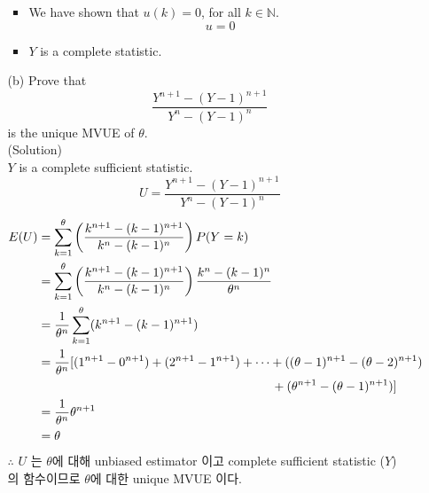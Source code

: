 \documentclass{oblivoir}
\newcommand{\flr}[1]{\left ( #1 \right )}
\newcommand{\blue}[1]{{\color{blue} #1}}
\begin{document}
\begin{enumerate}
\begin{enumerate}
\begin{itemize}
\item
We have shown that $u(k) = 0$, for all $k \in \mathbb{N}$.
$$
u = 0
$$

\item 
$Y$ is a complete statistic.
\end{itemize}

\vspace{3mm}
\item[(b)]
Prove that
$$
\frac{Y^{n+1} - (Y - 1)^{n+1}}{Y^n - (Y - 1)^n}
$$
is the unique MVUE of $\theta$. \\
\blue{(Solution)} \\
$Y$ is a complete sufficient statistic.
$$
U = \frac{Y^{n+1} - (Y - 1)^{n+1}}{Y^n - (Y - 1)^n}
$$
\begin{align*}
E(U) &= \sum_{k=1}^{\theta} \flr{\frac{k^{n+1} - (k - 1)^{n+1}}{k^n - (k - 1)^n}} P(Y=k) \\
&= \sum_{k=1}^{\theta} \flr{\frac{k^{n+1} - (k - 1)^{n+1}}{k^n - (k - 1)^n}} \frac{k^n - (k-1)^n}{\theta^n} \\
&= \frac{1}{\theta^n} \sum_{k=1}^{\theta} (k^{n+1} - (k-1)^{n+1}) \\
&= \frac{1}{\theta^n} [(1^{n+1} - 0^{n+1}) + (2^{n+1} - 1^{n+1}) + \cdots + ((\theta - 1)^{n+1} - (\theta-2)^{n+1}) \\
& \hphantom{{} + ((\theta - 1)^{n+1} - (\theta-2)^{n+1})} \qquad \qquad \qquad \;\; + (\theta^{n+1} - (\theta-1)^{n+1})] \\
&= \frac{1}{\theta^n} \theta^{n+1} \\
&= \theta
\end{align*}
$\therefore$ $U$ 는 $\theta$에 대해 unbiased estimator 이고 complete sufficient statistic ($Y$) 의 함수이므로 $\theta$에 대한 unique MVUE 이다.
\end{enumerate}
\end{enumerate}
\end{document}
